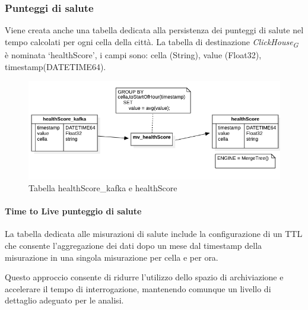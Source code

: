 \subsubsection{Punteggi di salute}
Viene creata anche una tabella dedicata alla persistenza dei punteggi di salute nel tempo calcolati per ogni cella della città. La tabella di destinazione \textit{ClickHouse}\textsubscript{\textit{G}} è nominata ‘healthScore’, i campi sono: cella (String), value (Float32), timestamp(DATETIME64).


\begin{figure}[H]
  \centering
  \includegraphics[width=1\textwidth]{../Images/SpecificaTecnica/healthScore.png}
  \caption{Tabella healthScore\_kafka e healthScore}
  \label{fig:HealthScore_tables}
\end{figure}

\paragraph{Time to Live punteggio di salute}
La tabella dedicata alle misurazioni di salute include la configurazione di un TTL che consente l'aggregazione dei dati dopo un mese dal timestamp della misurazione in una singola misurazione per cella e per ora.

Questo approccio consente di ridurre l'utilizzo dello spazio di archiviazione e accelerare il tempo di interrogazione, mantenendo comunque un livello di dettaglio adeguato per le analisi.
 